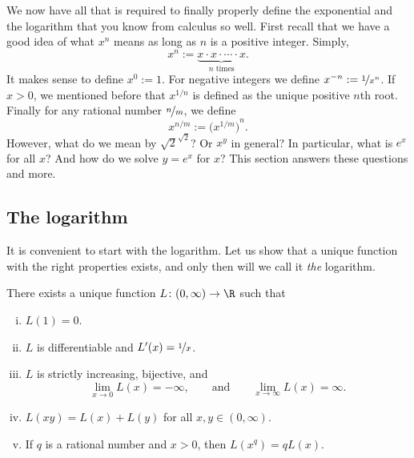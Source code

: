 \documentclass[12pt]{book}
\begin{document}
We now have all that is required to finally properly define the exponential
and the
logarithm that you know from calculus so well.
First recall that we have a good idea of what $x^n$ means as long as
$n$ is a positive integer.
Simply,
\begin{equation*}
x^n := \underbrace{x \cdot x \cdot \cdots \cdot x}_{\text{$n$ times}} .
\end{equation*}
It makes sense to define $x^0 := 1$.
For negative integers we define $x^{-n} := \nicefrac{1}{x^n}$.
If $x > 0$,
we mentioned before that $x^{1/n}$ is defined as
the unique positive $n$th root.
Finally for any rational
number $\nicefrac{n}{m}$, we define
\begin{equation*}
x^{n/m} := {\bigl(x^{1/m}\bigr)}^n .
\end{equation*}
However, what do we mean by $\sqrt{2}^{\sqrt{2}}$?
  Or
$x^y$ in general?
  In particular, what is $e^x$ for all $x$?
And how do we solve $y=e^x$ for $x$?
This section answers these questions and more.

\subsection*{The logarithm}

It is convenient to start with the logarithm.  
Let us show that
a unique function with the right properties exists, and only then will
we call it \emph{the} logarithm.

\begin{prop}
There exists a unique function $L \colon (0,\infty) \to \R$ such that
\begin{enumerate}[(i)]
\item \label{it:log:i}
$L(1) = 0$.
\item \label{it:log:ii}
$L$ is differentiable and $L'(x) = \nicefrac{1}{x}$.
\item \label{it:log:iii}
$L$ is strictly increasing, bijective, and
\begin{equation*}
\lim_{x\to 0} L(x) = -\infty , \qquad \text{and} \qquad
\lim_{x\to \infty} L(x) = \infty .
\end{equation*}
\item \label{it:log:iv}
$L(xy) = L(x)+L(y)$ for all $x,y \in (0,\infty)$.
\item \label{it:log:v}
If $q$ is a rational number and $x > 0$, then
$L(x^q) = q L(x)$.
\end{enumerate}
\end{prop}
\end{document}

